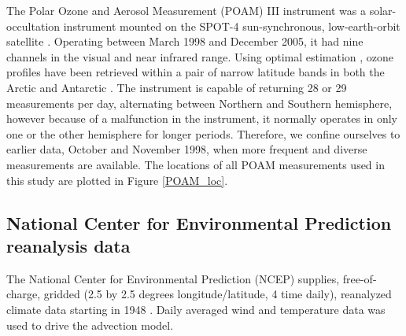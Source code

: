 The Polar Ozone and Aerosol Measurement (POAM) III instrument was a solar-
occultation instrument mounted on the SPOT-4 sun-synchronous, low-earth-orbit
satellite \citep{Lucke_etal1999}.
Operating between March 1998 and December 2005,
it had nine channels in the visual and near infrared range.
Using optimal estimation \citep{Rodgers2000}, ozone profiles have been retrieved 
within a pair of narrow latitude bands in both the Arctic and Antarctic \citep{Lumpe_etal2002}.  
The instrument is capable of returning 28 or 29 measurements per day,
alternating between Northern and Southern hemisphere, however because of
a malfunction
in the instrument, it normally operates in only one or the other hemisphere for longer periods.  Therefore, we confine ourselves to earlier data,
October and November 1998, when more frequent and diverse measurements
are available.
The locations of all POAM measurements used in this study are plotted in
Figure \ref{POAM_loc}.

\subsection{National Center for Environmental Prediction reanalysis data}

The National Center for Environmental Prediction (NCEP) supplies, 
free-of-charge,
gridded (2.5 by 2.5 degrees longitude/latitude, 4 time daily), reanalyzed 
climate data starting in 1948 \citep{Kalnay_etal1996}.
Daily averaged wind and temperature data was used to drive the advection model.

